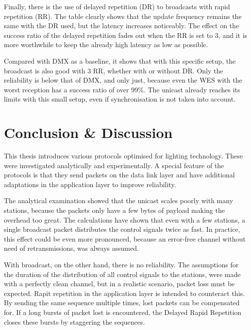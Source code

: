 Finally, there is the use of delayed repetition (DR) to broadcasts with rapid repetition (RR).
The table clearly shows that the update frequency remains the same with the DR used, but the latency increases noticeably.
The effect on the success ratio of the delayed repetition fades out when the RR is set to 3, 
and it is more worthwhile to keep the already high latency as low as possible.

Compared with DMX as a baseline, it shows that with this specific setup,
the broadcast is also good with 3 RR, whether with or without DR.
Only the reliability is below that of DMX, and only just,
because even the WES with the worst reception has a success ratio of over 99\%.
The unicast already reaches its limits with this small setup,
even if synchronisation is not taken into account.

\chapter{Conclusion \& Discussion}

This thesis introduces various protocols optimised for lighting technology.
These were investigated analytically and experimentally.
A special feature of the protocols is that they send packets on the data link layer
and have additional adaptations in the application layer to improve reliability.

The analytical examination showed that the unicast
scales poorly with many stations,
because the packets only have a few bytes of payload making the overhead too great.
The calculations have shown that even with a few stations, a single broadcast packet
distributes the control signals twice as fast.
In practice, this effect could be even more pronounced,
because an error-free channel without need of retransmissions, was always assumed.

With broadcast, on the other hand, there is no reliability.
The assumptions for the duration of the distribution of all control signals to the stations,
were made with a perfectly clean channel,
but in a realistic scenario, packet loss must be expected.
Rapit repetition in the application layer is intended to counteract this.
By sending the same sequence multiple times, lost packets can be compensated for.
If a long bursts of packet lost is encountered, 
the Delayed Rapid Repetition closes these bursts by staggering the sequences.

